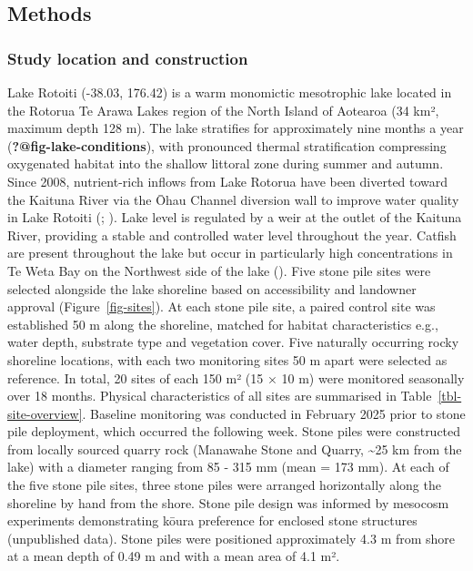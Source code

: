 \documentclass[
  letterpaper,
  DIV=11,
  numbers=noendperiod]{scrartcl}
\begin{document}
\subsection{Methods}\label{methods}

\subsubsection{Study location and
construction}\label{study-location-and-construction}

Lake Rotoiti (-38.03, 176.42) is a warm monomictic mesotrophic lake
located in the Rotorua Te Arawa Lakes region of the North Island of
Aotearoa (34 km², maximum depth 128 m). The lake stratifies for
approximately nine months a year ({\textbf{?@fig-lake-conditions}}),
with pronounced thermal stratification compressing oxygenated habitat
into the shallow littoral zone during summer and autumn. Since 2008,
nutrient-rich inflows from Lake Rotorua have been diverted toward the
Kaituna River via the Ōhau Channel diversion wall to improve water
quality in Lake Rotoiti (; ). Lake level is
regulated by a weir at the outlet of the Kaituna River, providing a
stable and controlled water level throughout the year. Catfish are
present throughout the lake but occur in particularly high
concentrations in Te Weta Bay on the Northwest side of the lake
(). Five stone pile sites were
selected alongside the lake shoreline based on accessibility and
landowner approval (Figure~\ref{fig-sites}). At each stone pile site, a
paired control site was established 50 m along the shoreline, matched
for habitat characteristics e.g., water depth, substrate type and
vegetation cover. Five naturally occurring rocky shoreline locations,
with each two monitoring sites 50 m apart were selected as reference. In
total, 20 sites of each 150 m² (15 × 10 m) were monitored seasonally
over 18 months. Physical characteristics of all sites are summarised in
Table~\ref{tbl-site-overview}. Baseline monitoring was conducted in
February 2025 prior to stone pile deployment, which occurred the
following week. Stone piles were constructed from locally sourced quarry
rock (Manawahe Stone and Quarry, \textasciitilde25 km from the lake)
with a diameter ranging from 85 - 315 mm (mean = 173 mm). At each of the
five stone pile sites, three stone piles were arranged horizontally
along the shoreline by hand from the shore. Stone pile design was
informed by mesocosm experiments demonstrating kōura preference for
enclosed stone structures (unpublished data). Stone piles were
positioned approximately 4.3 m from shore at a mean depth of 0.49 m and
with a mean area of 4.1 m².
\end{document}
